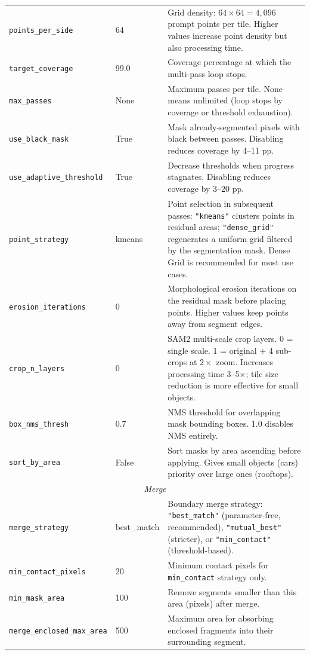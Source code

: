 \documentclass[review,11pt,authoryear]{elsarticle}
\begin{document}
\begin{table}[htbp]
\begin{tabular}{p{3.8cm}lp{6cm}}
\midrule
\texttt{points\_per\_side} & 64 & Grid density: $64 \times 64 = 4{,}096$ prompt points per tile. Higher values increase point density but also processing time. \\
\texttt{target\_coverage} & 99.0 & Coverage percentage at which the multi-pass loop stops. \\
\texttt{max\_passes} & None & Maximum passes per tile. None means unlimited (loop stops by coverage or threshold exhaustion). \\
\texttt{use\_black\_mask} & True & Mask already-segmented pixels with black between passes. Disabling reduces coverage by 4--11 pp. \\
\texttt{use\_adaptive\_threshold} & True & Decrease thresholds when progress stagnates. Disabling reduces coverage by 3--20 pp. \\
\texttt{point\_strategy} & kmeans & Point selection in subsequent passes: \texttt{"kmeans"} clusters points in residual areas; \texttt{"dense\_grid"} regenerates a uniform grid filtered by the segmentation mask. Dense Grid is recommended for most use cases. \\
\texttt{erosion\_iterations} & 0 & Morphological erosion iterations on the residual mask before placing points. Higher values keep points away from segment edges. \\
\texttt{crop\_n\_layers} & 0 & SAM2 multi-scale crop layers. 0 = single scale. 1 = original + 4 sub-crops at $2\times$ zoom. Increases processing time 3--5$\times$; tile size reduction is more effective for small objects. \\
\texttt{box\_nms\_thresh} & 0.7 & NMS threshold for overlapping mask bounding boxes. 1.0 disables NMS entirely. \\
\texttt{sort\_by\_area} & False & Sort masks by area ascending before applying. Gives small objects (cars) priority over large ones (rooftops). \\
\midrule
\multicolumn{3}{c}{\textit{Merge}} \\
\midrule
\texttt{merge\_strategy} & best\_match & Boundary merge strategy: \texttt{"best\_match"} (parameter-free, recommended), \texttt{"mutual\_best"} (stricter), or \texttt{"min\_contact"} (threshold-based). \\
\texttt{min\_contact\_pixels} & 20 & Minimum contact pixels for \texttt{min\_contact} strategy only. \\
\texttt{min\_mask\_area} & 100 & Remove segments smaller than this area (pixels) after merge. \\
\texttt{merge\_enclosed\_max\_area} & 500 & Maximum area for absorbing enclosed fragments into their surrounding segment. \\

\end{tabular}
\end{table}
\end{document}
